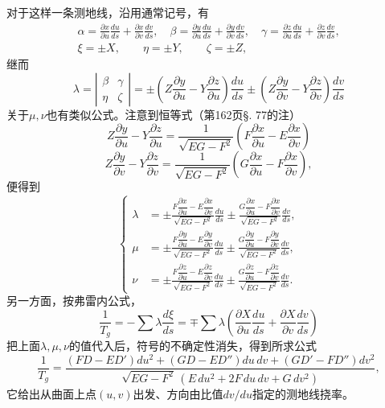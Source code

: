 对于这样一条测地线，沿用通常记号，有
\[
\begin{gathered}
 \alpha=\frac{\partial x}{\partial u}\frac{du}{ds}+\frac{\partial x}{\partial v}\frac{dv}{ds},\quad
 \beta=\frac{\partial y}{\partial u}\frac{du}{ds}+\frac{\partial y}{\partial v}\frac{dv}{ds},\quad
 \gamma=\frac{\partial z}{\partial u}\frac{du}{ds}+\frac{\partial z}{\partial v}\frac{dv}{ds},\\
 \xi=\pm X,
 \qquad
 \eta=\pm Y,
 \qquad
 \zeta=\pm Z,
\end{gathered}
\]
继而
\[
 \lambda=\left|\begin{matrix}\beta&\gamma\\\eta&\zeta\end{matrix}\right|
 =\pm\left(Z\frac{\partial y}{\partial u}-Y\frac{\partial z}{\partial u}\right)\frac{du}{ds}
 \pm\left(Z\frac{\partial y}{\partial v}-Y\frac{\partial z}{\partial v}\right)\frac{dv}{ds}
\]
关于\(\mu,\nu\)也有类似公式。注意到恒等式（第162页\S. 77的注）
\[
 Z\frac{\partial y}{\partial u}-Y\frac{\partial z}{\partial u}=\frac1{\sqrt{EG-F^2}}\left(F\frac{\partial x}{\partial u}-E\frac{\partial x}{\partial v}\right)
\]
\[
 Z\frac{\partial y}{\partial v}-Y\frac{\partial z}{\partial v}=\frac1{\sqrt{EG-F^2}}\left(G\frac{\partial x}{\partial u}-F\frac{\partial x}{\partial v}\right),
\]
便得到
\[
\left\{\begin{aligned}
 \lambda&=\pm\frac{F\dfrac{\partial x}{\partial u}-E\dfrac{\partial x}{\partial v}}{\sqrt{EG-F^2}}\frac{du}{ds}
 \pm\frac{G\dfrac{\partial x}{\partial u}-F\dfrac{\partial x}{\partial v}}{\sqrt{EG-F^2}}\frac{dv}{ds},\\
 \mu&=\pm\frac{F\dfrac{\partial y}{\partial u}-E\dfrac{\partial y}{\partial v}}{\sqrt{EG-F^2}}\frac{du}{ds}
 \pm\frac{G\dfrac{\partial y}{\partial u}-F\dfrac{\partial y}{\partial v}}{\sqrt{EG-F^2}}\frac{dv}{ds},\\
 \nu&=\pm\frac{F\dfrac{\partial z}{\partial u}-E\dfrac{\partial z}{\partial v}}{\sqrt{EG-F^2}}\frac{du}{ds}
 \pm\frac{G\dfrac{\partial z}{\partial u}-F\dfrac{\partial z}{\partial v}}{\sqrt{EG-F^2}}\frac{dv}{ds}.
\end{aligned}\right.
\]
另一方面，按弗雷内公式，
\[
 \frac1{T_g}=-\sum\lambda\frac{d\xi}{ds}=\mp\sum\lambda\left(\frac{\partial X}{\partial u}\frac{du}{ds}+\frac{\partial X}{\partial v}\frac{dv}{ds}\right)
\]
把上面\(\lambda,\mu,\nu\)的值代入后，符号的不确定性消失，得到所求公式
\begin{equation}\tag{18}
 \frac1{T_g}=\frac{(FD-ED')du^2+(GD-ED'')du\,dv+(GD'-FD'')dv^2}{\sqrt{EG-F^2}\,(E\,du^2+2F\,du\,dv+G\,dv^2)},
\end{equation}
它给出从曲面上点\((u,v)\)出发、方向由比值\(dv/du\)指定的测地线挠率。

